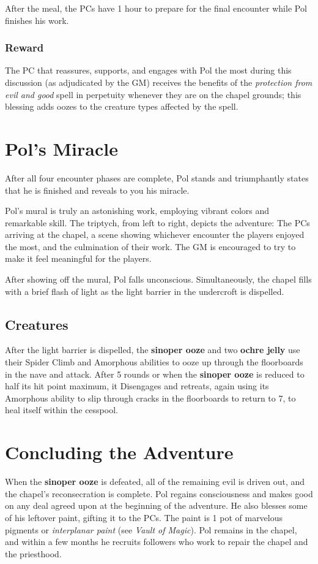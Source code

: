 \documentclass[10pt,a4paper,twoside,bg=print,twocolumn,openany,nodeprecatedcode]{dndbook}
\begin{document}
After the meal, the PCs have 1 hour to prepare for the final encounter while Pol finishes his work.

\subsubsection{Reward}
The PC that reassures, supports, and engages with Pol the most during this discussion (as adjudicated by the GM) receives the benefits of the \textit{protection from evil and good} spell in perpetuity whenever they are on the chapel grounds; this blessing adds oozes to the creature types affected by the spell.

\section{Pol's Miracle}
After all four encounter phases are complete, Pol stands and triumphantly states that he is finished and reveals to you his miracle.

Pol's mural is truly an astonishing work, employing vibrant colors and remarkable skill. The triptych, from left to right, depicts the adventure: The PCs arriving at the chapel, a scene showing whichever encounter the players enjoyed the most, and the culmination of their work. The GM is encouraged to try to make it feel meaningful for the players.

After showing off the mural, Pol falls unconscious. Simultaneously, the chapel fills with a brief flash of light as the light barrier in the undercroft is dispelled.

\subsection{Creatures}
After the light barrier is dispelled, the \textbf{sinoper ooze} and two \textbf{ochre jelly} use their Spider Climb and Amorphous abilities to ooze up through the floorboards in the nave and attack. After 5 rounds or when the \textbf{sinoper ooze} is reduced to half its hit point maximum, it Disengages and retreats, again using its Amorphous ability to slip through cracks in the floorboards to return to 7, to heal itself within the cesspool.

\section{Concluding the Adventure}
When the \textbf{sinoper ooze} is defeated, all of the remaining evil is driven out, and the chapel's reconsecration is complete. Pol regains consciousness and makes good on any deal agreed upon at the beginning of the adventure. He also blesses some of his leftover paint, gifting it to the PCs. The paint is 1 pot of marvelous pigments or \textit{interplanar paint} (see \textit{Vault of Magic}). Pol remains in the chapel, and within a few months he recruits followers who work to repair the chapel and the priesthood.
\end{document}
